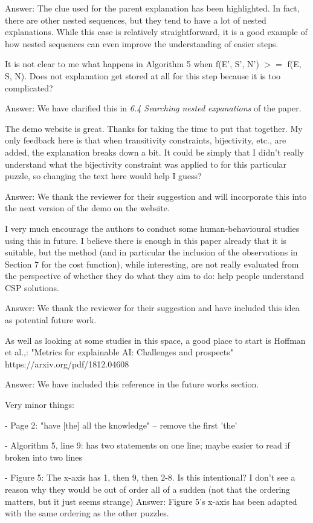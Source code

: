 \documentclass{article}
\newcommand\comment[1]{\marginpar{\tiny #1}}
\renewcommand\comment[1]{#1}
\newcommand{\emilio}[1]{{\comment{Answer: \color{red}#1}}}
\begin{document}
\emilio{The clue used for the parent explanation has been highlighted. In fact, there are other nested sequences, but they tend to have a lot of nested explanations. While this case is relatively straightforward, it is a good example of how nested sequences can even improve the understanding of easier steps.}

\begin{quoteit}
It is not clear to me what happens in Algorithm 5 when f(E', S', N') $>=$ f(E, S, N). Does not explanation get stored at all for this step because it is too complicated? 
\end{quoteit}

\emilio{We have clarified this in \emph{6.4 Searching nested expanations} of the paper.}

\begin{quoteit}
The demo website is great. Thanks for taking the time to put that together. My only feedback here is that when transitivity constraints, bijectivity, etc., are added, the explanation breaks down a bit. It could be simply that I didn't really  understand what the bijectivity constraint was applied to for this particular puzzle, so changing the text here would help I guess?
\end{quoteit}

\emilio{We thank the reviewer for their suggestion and will incorporate this into the next version of the demo on the website.}

\begin{quoteit}
I very much encourage the authors to conduct some human-behavioural studies using this in future. I believe there is enough in this paper already that it is suitable, but the method (and in particular the inclusion of the observations in Section 7 for the cost function), while interesting, are not really evaluated from the perspective of whether they do what they aim to do: help people understand CSP solutions. 
\end{quoteit}

\emilio{We thank the reviewer for their suggestion and have included this idea as potential future work.}


\begin{quoteit}
As well as looking at some studies in this space, a good place to start is Hoffman et al.,: "Metrics for explainable AI: Challenges and prospects" https://arxiv.org/pdf/1812.04608 
\end{quoteit}

\emilio{We have included this reference in the future works section.}

Very minor things:

- Page 2: "have [the] all the knowledge" -- remove the first 'the'

- Algorithm 5, line 9: has two statements on one line; maybe easier to
read if broken into two lines

- Figure 5: The x-axis has 1, then 9, then 2-8. Is this intentional? I
don't see a reason why they would be out of order all of a sudden (not
that the ordering matters, but it just seems strange)
\emilio{Figure 5's x-axis has been adapted with the same ordering as the other puzzles.}
\end{document}
